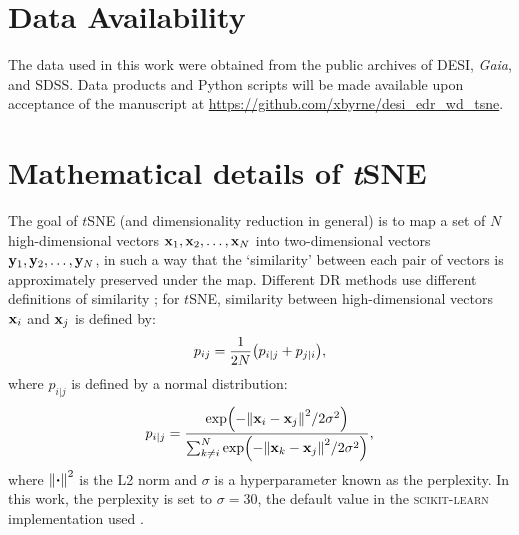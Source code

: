 \documentclass[fleqn,usenatbib]{mnras}
\def\xb{\vb{x}}
\def\yb{\vb{y}}
\begin{document}
\section*{Data Availability}

The data used in this work were obtained from the public archives of DESI, \textit{Gaia}, and SDSS.
Data products and Python scripts will be made available upon acceptance of the manuscript at \url{https://github.com/xbyrne/desi_edr_wd_tsne}.









\appendix

\section{Mathematical details of \textit{t}SNE}
\label{sec:app}

The goal of $t$SNE (and dimensionality reduction in general) is to map a set of $N$ high-dimensional vectors $\xb_1, \xb_2, \dots, \xb_N$ into two-dimensional vectors $\yb_1, \yb_2, \dots, \yb_N$, in such a way that the `similarity' between each pair of vectors is approximately preserved under the map.
Different DR methods use different definitions of similarity \citep{umap}; for $t$SNE, similarity between high-dimensional vectors $\xb_i$ and $\xb_j$ is defined by:
\begin{equation}
p_{ij}
= \frac{1}{2N} \qty(
    p_{i|j} + p_{j|i}
),
\end{equation}
where $p_{i|j}$ is defined by a normal distribution:
\begin{equation}
p_{i|j}
= \frac{
    \exp(-\norm{\xb_i - \xb_j}^2 / 2\sigma^2)
}{
    \sum_{k\neq i}^N
    \exp(-\norm{\xb_k - \xb_j}^2 / 2\sigma^2)
},
\end{equation}
where $\norm{\vdot}^2$ is the L2 norm and $\sigma$ is a hyperparameter known as the perplexity.
In this work, the perplexity is set to $\sigma=30$, the default value in the \textsc{scikit-learn} implementation used \citep{sklearn}.
\end{document}
